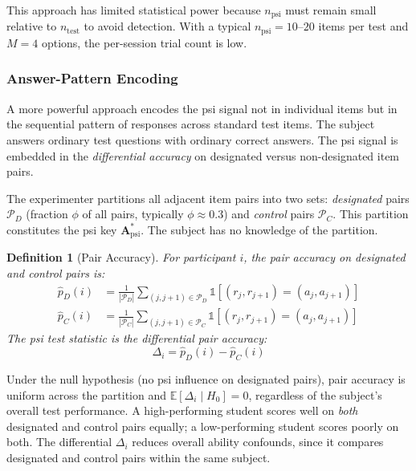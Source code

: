 \documentclass[11pt,letterpaper]{article}
\newtheorem{definition}{Definition}
\begin{document}
This approach has limited statistical power because $n_{\text{psi}}$ must remain small relative to $n_{\text{test}}$ to avoid detection. With a typical $n_{\text{psi}} = 10$--$20$ items per test and $M = 4$ options, the per-session trial count is low.

\subsubsection{Answer-Pattern Encoding}
\label{sec:ape}

A more powerful approach encodes the psi signal not in individual items but in the sequential pattern of responses across standard test items. The subject answers ordinary test questions with ordinary correct answers. The psi signal is embedded in the \textit{differential accuracy} on designated versus non-designated item pairs.

The experimenter partitions all adjacent item pairs into two sets: \textit{designated} pairs $\mathcal{P}_D$ (fraction $\phi$ of all pairs, typically $\phi \approx 0.3$) and \textit{control} pairs $\mathcal{P}_C$. This partition constitutes the psi key $\mathbf{A}^*_{\text{psi}}$. The subject has no knowledge of the partition.

\begin{definition}[Pair Accuracy]
For participant $i$, the pair accuracy on designated and control pairs is:
\begin{align}
\hat{p}_D(i) &= \frac{1}{|\mathcal{P}_D|} \sum_{(j,j+1) \in \mathcal{P}_D} \mathbb{1}[(r_j, r_{j+1}) = (a_j, a_{j+1})] \label{eq:pd} \\
\hat{p}_C(i) &= \frac{1}{|\mathcal{P}_C|} \sum_{(j,j+1) \in \mathcal{P}_C} \mathbb{1}[(r_j, r_{j+1}) = (a_j, a_{j+1})] \label{eq:pc}
\end{align}
The psi test statistic is the differential pair accuracy:
\begin{equation}
\Delta_i = \hat{p}_D(i) - \hat{p}_C(i)
\label{eq:pattern}
\end{equation}
\end{definition}

Under the null hypothesis (no psi influence on designated pairs), pair accuracy is uniform across the partition and $\mathbb{E}[\Delta_i \mid H_0] = 0$, regardless of the subject's overall test performance. A high-performing student scores well on \textit{both} designated and control pairs equally; a low-performing student scores poorly on both. The differential $\Delta_i$ reduces overall ability confounds, since it compares designated and control pairs within the same subject.
\end{document}
